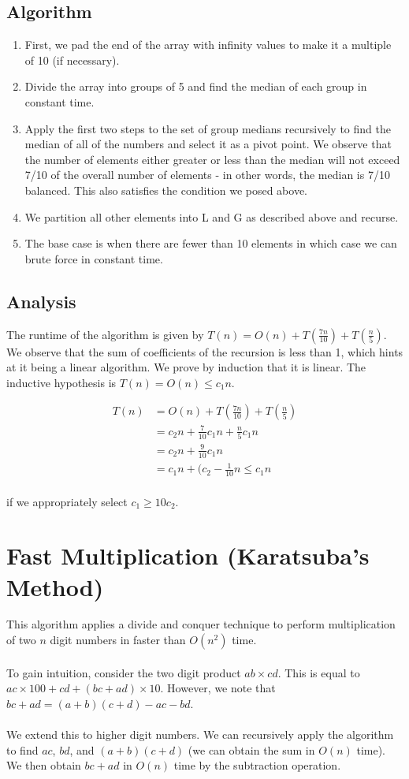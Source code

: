 \documentclass{article}
\begin{document}
\subsection*{Algorithm}
\begin{enumerate}
    \item First, we pad the end of the array with infinity values to make it a multiple of 10 (if necessary).
    \item Divide the array into groups of 5 and find the median of each group in constant time.
    \item Apply the first two steps to the set of group medians recursively to find the median of all of the numbers and select it as a pivot point. We observe that the number of elements either greater or less than the median will not exceed 7/10 of the overall number of elements - in other words, the median is 7/10 balanced. This also satisfies the condition we posed above.
    \item We partition all other elements into L and G as described above and recurse.
    \item The base case is when there are fewer than 10 elements in which case we can brute force in constant time.
\end{enumerate}

\subsection*{Analysis}
The runtime of the algorithm is given by $T(n) = O(n) + T(\frac{7n}{10}) + T(\frac{n}{5})$. We observe that the sum of coefficients of the recursion is less than 1, which hints at it being a linear algorithm. We prove by induction that it is linear. The inductive hypothesis is $T(n) = O(n) \leq c_1 n$.

\begin{align*}
    T(n) &= O(n) + T(\frac{7n}{10}) + T(\frac{n}{5})\\
    &= c_2 n + \frac{7}{10} c_1 n + \frac{n}{5} c_1 n \\
    &= c_2 n + \frac{9}{10} c_1 n \\
    &= c_1 n + (c_2 - \frac{1}{10} n \leq c_1 n
\end{align*}
\\
if we appropriately select $c_1 \geq 10 c_2$.

\newpage
\section{Fast Multiplication (Karatsuba's Method)}
This algorithm applies a divide and conquer technique to perform multiplication of two $n$ digit numbers in faster than $O(n^2)$ time.
\\
\\
To gain intuition, consider the two digit product $ab \times cd$. This is equal to $ac \times 100 + cd + (bc + ad) \times 10$. However, we note that $bc + ad = (a + b) (c + d) - ac - bd$.
\\
\\
We extend this to higher digit numbers. We can recursively apply the algorithm to find $ac$, $bd$, and $(a+b)(c+d)$ (we can obtain the sum in $O(n)$ time). We then obtain $bc + ad$ in $O(n)$ time by the subtraction operation.
\end{document}
